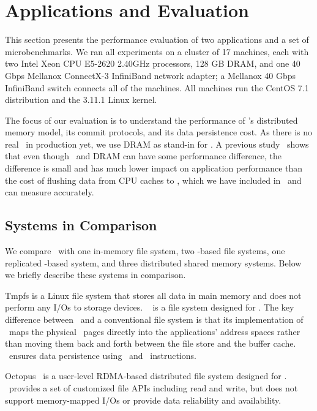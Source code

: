 \section{Applications and Evaluation}
\label{sec:app}

This section presents the performance evaluation of two applications and a set of microbenchmarks.
We ran all experiments on a cluster of 17 machines, each with two Intel Xeon CPU E5-2620 2.40GHz
processors, 128 GB DRAM, and one 40 Gbps Mellanox ConnectX-3 InfiniBand network adapter;
a Mellanox 40 Gbps InfiniBand switch connects all of the machines. 
All machines run the CentOS 7.1 distribution and the 3.11.1 Linux kernel.

The focus of our evaluation is to understand the performance of \dsnvm's distributed memory model,
its commit protocols, and its data persistence cost. As there is no real \nvm\ in production yet,
we use DRAM as stand-in for \nvm. A previous study~\cite{Zhang15-NVMMStudy} shows that even though
\nvm\ and DRAM can have some performance difference, the difference is small and has much lower impact
on application performance than the cost of flushing data from CPU caches to \nvm, which we have
included in \hotpot\ and can measure accurately.

\subsection{Systems in Comparison}
\label{sec:comparesys}
We compare \hotpot\ with one in-memory file system, two \nvm-based file systems, 
one replicated \nvm-based system, and three distributed shared memory systems.
Below we briefly describe these systems in comparison.

Tmpfs is a Linux file system that stores all data in main memory and does not perform any I/Os to storage devices.
\pmfs~\cite{Dulloor14-EuroSys} is a file system designed for \nvm. 
The key difference between \pmfs\ and a conventional file system is that its implementation of
\mmap\ maps the physical \nvm\ pages directly into the applications' address spaces rather than moving them back and
forth between the file store and the buffer cache.
\pmfs\ ensures data persistence using \sfence\ and \clflush\ instructions.

Octopus~\cite{Octopus} is a user-level RDMA-based distributed file system designed for \nvm.
\Octopus\ provides a set of customized file APIs including read and write,
but does not support memory-mapped I/Os or provide data reliability and availability.

